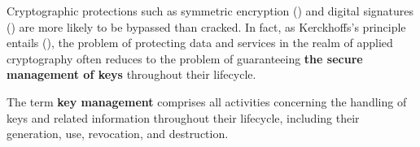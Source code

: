 Cryptographic protections such as symmetric encryption () and digital signatures () are more likely to be bypassed than cracked. In fact, as Kerckhoffs's principle entails (), the problem of protecting data and services in the realm of applied cryptography often reduces to the problem of guaranteeing \textbf{the secure management of keys} throughout their lifecycle.

The term \textbf{key management} comprises all activities concerning the handling of keys and related information throughout their lifecycle, including their generation, use, revocation, and destruction.

